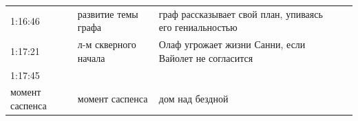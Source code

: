 \begin{longtable}[]{@{}llll@{}}
\begin{minipage}[t]{0.15\columnwidth}
1:16:46\strut
\end{minipage} & \begin{minipage}[t]{0.20\columnwidth}\raggedright\strut
развитие темы графа\strut
\end{minipage} & \begin{minipage}[t]{0.27\columnwidth}\raggedright\strut
граф рассказывает свой план,
упиваясь его гениальностью\strut
\end{minipage} & \begin{minipage}[t]{0.27\columnwidth}\raggedright\strut
\strut
\end{minipage}\tabularnewline
\begin{minipage}[t]{0.15\columnwidth}\raggedright\strut
1:17:21\strut
\end{minipage} & \begin{minipage}[t]{0.20\columnwidth}\raggedright\strut
л-м скверного начала\strut
\end{minipage} & \begin{minipage}[t]{0.27\columnwidth}\raggedright\strut
Олаф угрожает жизни Санни,
если Вайолет не согласится\strut
\end{minipage} & \begin{minipage}[t]{0.27\columnwidth}\raggedright\strut
\strut
\end{minipage}\tabularnewline
\begin{minipage}[t]{0.15\columnwidth}\raggedright\strut
1:17:45\strut
\end{minipage} & \begin{minipage}[t]{0.20\columnwidth}\raggedright\strut
\strut
\end{minipage} & \begin{minipage}[t]{0.27\columnwidth}\raggedright\strut
\strut
\end{minipage} & \begin{minipage}[t]{0.27\columnwidth}\raggedright\strut
\strut
\end{minipage}\tabularnewline
\begin{minipage}[t]{0.15\columnwidth}\raggedright\strut
момент саспенса\strut
\end{minipage} & \begin{minipage}[t]{0.20\columnwidth}\raggedright\strut
момент саспенса\strut
\end{minipage} & \begin{minipage}[t]{0.27\columnwidth}\raggedright\strut
дом над бездной\strut
\end{minipage} & \begin{minipage}[t]{0.27\columnwidth}\raggedright\strut

\end{minipage}
\end{longtable}
